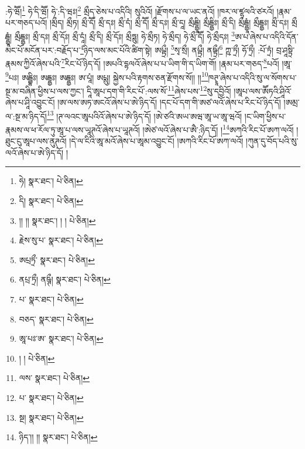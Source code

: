 :ཧེ་ཝཽ།\footnote{ཧེ།  སྣར་ཐང་།  པེ་ཅིན། } ཧེ་དི་ཝཽ། ཧེ་:དི་ཝཿ།\footnote{དི།  སྣར་ཐང་།  པེ་ཅིན། } མྲྀད་ཅེས་པ་འདིའི། སུའིའོ། །རྫོགས་པ་ལ་ཡང་ནའོ། །ཁར་ལ་ཛྷལའི་ཙརའོ། །རྣམ་པར་གཅད་པའོ། །མྲྀད། མྲྀཏ། མྲྀ་དཽ། མྲྀ་དཿ། མྲྀ་དཾ། མྲྀ་དཽ། མྲྀ་དཿ། མྲྀ་དཱ། མྲྀདྦྷྱཱི། མྲྀདྦྷྱིཿ། མྲྀ་དི། མྲྀདྦྷྱཱཾ། མྲྀདྦྷྱཿ། མྲྀ་དཿ། མྲྀ དྦྷྱཱཾ། མྲྀདྦྷྱཿ། མྲྀ་དཿ། མྲྀ་དོཿ། མྲྀ་དཱཾ། མྲྀ་དི། མྲྀ་དོཿ། མྲྀཏྶུ། ཧེ་མྲྀཏ། ཧེ་མྲྀད། ཧེ་མྲྀ་དཽ། ཧེ་མྲྀདཿ། \footnote{།། །།  སྣར་ཐང་། ། །  པེ་ཅིན། }ཨ་པ་ཞེས་པ་འདིའི་དོན་མང་པོ་མངོན་པར་:བརྗོད་པ་\footnote{རྗེས་སུ་པ་  སྣར་ཐང་།  པེ་ཅིན། }ཉིད་ལས་མང་པོའི་ཚིག་སྟེ། ཨཔྟྲྀ། \footnote{ཨཔྲཏྲྀ་  སྣར་ཐང་།  པེ་ཅིན། }སྭ་སྲྀ། ནཔྟྲྀ། ནཥྟྲྀ།\footnote{ནཔྲ་ཏྲྀ། ནཥྚྀ།  སྣར་ཐང་།  པེ་ཅིན། } ཀྵ་ཏྲྀ། ཧོ་ཏྲྀ། :པོ་ཏྲཾ། བྲ་ཤཱསྟྲི་རྣམས་ཀྱིའོ་ཞེས་པའི་\footnote{པ་  སྣར་ཐང་།  པེ་ཅིན། }རིང་པོ་ཉིད་དོ། །ཨཔའི་དྷལའོ་ཞེས་པ་པ་ཡིག་གི་ད་ཡིག་གོ། །རྣམ་པར་གཅད་\footnote{བཅད་  སྣར་ཐང་།  པེ་ཅིན། }པའོ། །ཨཱ་\footnote{ཨཱ་པཿ་ཨ་  སྣར་ཐང་།  པེ་ཅིན། }པཿ། ཨདྦྷིཿ། ཨདྦྷྱཿ། ཨདྦྷྱཿ། ཨ་པཱཾ། ཨཔྶུ། སྐྱེས་པའི་རྟགས་ཅན་རྫོགས་སོ།། །།\footnote{། །  པེ་ཅིན། }ཁཊྭཱ་ཞེས་པ་འདིའི་སུ་ལ་སོགས་པ་སྔ་མ་བཞིན་ཕྱིས་པ་ལས་ཀྱང་། དཱི་ཨཱཔ་དག་གི་རིང་པོ་:ལས་སོ་\footnote{ལས་  སྣར་ཐང་།  པེ་ཅིན། }ཞེས་པས་\footnote{པ་  སྣར་ཐང་།  པེ་ཅིན། }སུ་དབྱིའོ། །ཨཱཔ་ལས་ཨཽཏའི་ཤཱིའོ་ཞེས་པ་ཤཱི་འབྱུང་ངོ། །ཨ་ལས་ཨཏ་ཨངའོ་ཞེས་པ་ཨེ་ཉིད་དོ། །དང་པོ་དག་གི་ཨཙ་ལའོ་ཞེས་པ་རིང་པོ་ཉིད་དོ། །ཨམྲ་ལ་:སྔ་མ་ཉིད་དོ།\footnote{སྔ།  སྣར་ཐང་།  པེ་ཅིན། } །ཊ་ལའང་ཨཱཔའིའོ་ཞེས་པ་ཨེ་ཉིད་དོ། །ཨེ་ཙའི་ཨཡ་ཨཝ་ཨཱ་ཡ་ཨཱ་ཝའོ། །ང་ཡིག་ཕྱིས་པ་རྣམས་ལ་ཕ་རོལ་ཏུ་ཨཱ་པ་ལས་ཡཱཊའོ་ཞེས་པ་ཡཱཊའོ། །ཨེཙ་ལའོ་ཞེས་པ་ཨཻ་:ཉིད་དོ། །\footnote{ཉིད་།། །།  སྣར་ཐང་།  པེ་ཅིན། }ཨཀའི་རིང་པོ་ཨཀ་ལའོ། །ཐུང་ངུ་ཨཱཔ་ལས་ནུཊའོ། །དེ་ལ་ངིའི་ཨཱ་མའོ་ཞེས་པ་ཨཱམ་འབྱུང་ངོ། །ཨཀའི་རིང་པོ་ཨཀ་ལའོ། །ཀུན་དུ་བོད་པའི་སུ་ལའོ་ཞེས་པ་ཨེ་ཉིད་དོ། །
